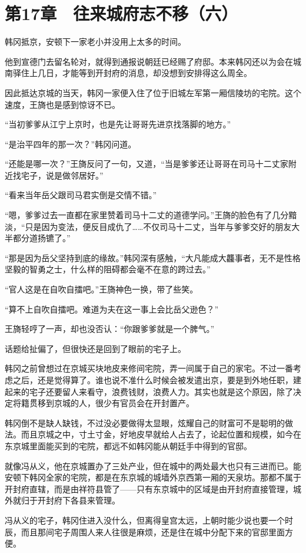 \section{第17章　往来城府志不移（六）}

韩冈抵京，安顿下一家老小并没用上太多的时间。

他到宣德门去留名轮对，就得到通报说朝廷已经赐了府邸。本来韩冈还以为会在城南驿住上几日，才能等到开封府的消息，却没想到安排得这么周全。

因此抵达京城的当天，韩冈一家便入住了位于旧城左军第一厢信陵坊的宅院。这个速度，王旖也是感到惊讶不已。

“当初爹爹从江宁上京时，也是先让哥哥先进京找落脚的地方。”

“是治平四年的那一次？”韩冈问道。

“还能是哪一次？”王旖反问了一句，又道，“当是爹爹还让哥哥在司马十二丈家附近找宅子，说是做邻居好。”

“看来当年岳父跟司马君实倒是交情不错。”

“嗯，爹爹过去一直都在家里赞着司马十二丈的道德学问。”王旖的脸色有了几分黯淡，“只是因为变法，便反目成仇了……不仅司马十二丈，当年与爹爹交好的朋友大半都分道扬镳了。”

“那是因为岳父坚持到底的缘故。”韩冈深有感触，“大凡能成大龘事者，无不是性格坚毅的智勇之士，什么样的阻碍都会毫不在意的跨过去。”

“官人这是在自吹自擂吧。”王旖神色一换，带了些笑。

“算不上自吹自擂吧。难道为夫在这一事上会比岳父逊色？”

王旖轻哼了一声，却也没否认：“你跟爹爹就是一个脾气。”

话题给扯偏了，但很快还是回到了眼前的宅子上。

韩冈之前曾想过在京城买块地皮来修间宅院，弄一间属于自己的家宅。不过一番考虑之后，还是觉得算了。谁也说不准什么时候会被发遣出京，要是到外地任职，建起来的宅子还要留人来看守，浪费钱财，浪费人力。其实也就是这个原因，除了决定将籍贯移到京城的人，很少有官员会在开封置产。

韩冈倒不是缺人缺钱，不过没必要做得太显眼，炫耀自己的财富可不是聪明的做法。而且京城之中，寸土寸金，好地皮早就给人占去了，论起位置和规模，如今在东京城里面能买到的宅院，都远不如韩冈能从朝廷手中得到的官邸。

就像冯从义，他在京城置办了三处产业，但在城中的两处最大也只有三进而已。能安顿下韩冈全家的宅院，都是在东京城的城墙外京西第一厢的天泉坊。那都不属于开封府直辖，而是由祥符县管了——只有东京城中的区域是由开封府直接管理，城外就归于开封府下各县来管理。

冯从义的宅子，韩冈住进入没什么，但离得皇宫太远，上朝时能少说也要一个时辰，而且那间宅子周围人来人往很是麻烦，还是住在城中分配下来的官邸里面方便。

